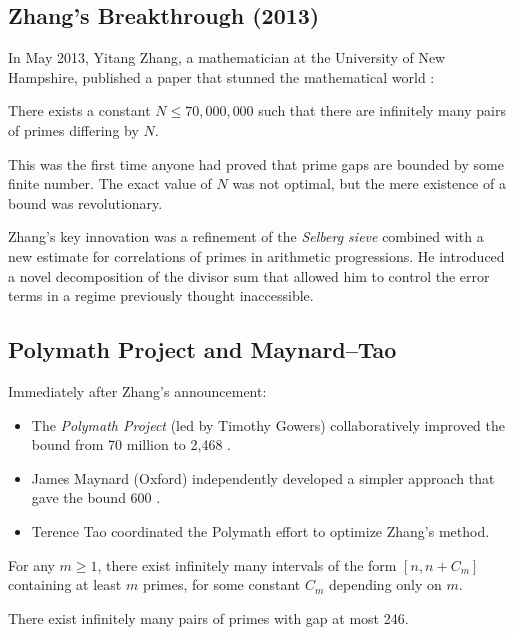 \subsection{Zhang's Breakthrough (2013)}

In May 2013, Yitang Zhang, a mathematician at the University of New Hampshire, published a paper that stunned the mathematical world \cite{zhang2014}:

\begin{theorem}
There exists a constant $N \leq 70,000,000$ such that there are infinitely many pairs of primes differing by $N$.
\end{theorem}

This was the first time anyone had proved that prime gaps are bounded by some finite number. The exact value of $N$ was not optimal, but the mere existence of a bound was revolutionary.

Zhang's key innovation was a refinement of the \emph{Selberg sieve} combined with a new estimate for correlations of primes in arithmetic progressions. He introduced a novel decomposition of the divisor sum that allowed him to control the error terms in a regime previously thought inaccessible.

\subsection{Polymath Project and Maynard--Tao}

Immediately after Zhang's announcement:

\begin{itemize}
\item The \emph{Polymath Project} (led by Timothy Gowers) collaboratively improved the bound from 70 million to 2,468 \cite{polymath2014}.
\item James Maynard (Oxford) independently developed a simpler approach that gave the bound 600 \cite{maynard2015}.
\item Terence Tao coordinated the Polymath effort to optimize Zhang's method.
\end{itemize}

\begin{theorem}
For any $m \geq 1$, there exist infinitely many intervals of the form $[n, n + C_m]$ containing at least $m$ primes, for some constant $C_m$ depending only on $m$.
\end{theorem}

\begin{theorem}
There exist infinitely many pairs of primes with gap at most 246.
\end{theorem}

